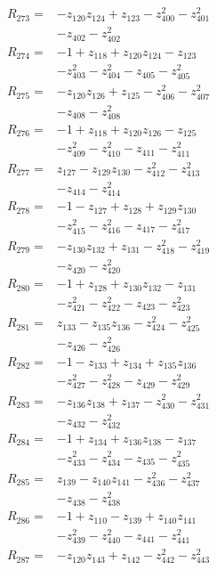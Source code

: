 \begin{align*}
R_{273}={}&-z_{120}z_{124} +z_{123} -z_{400}^{2} -z_{401}^{2}\\
&-z_{402} -z_{402}^{2}\\[2pt]
R_{274}={}&-1 +z_{118} +z_{120}z_{124} -z_{123}\\
&-z_{403}^{2} -z_{404}^{2} -z_{405} -z_{405}^{2}\\[2pt]
R_{275}={}&-z_{120}z_{126} +z_{125} -z_{406}^{2} -z_{407}^{2}\\
&-z_{408} -z_{408}^{2}\\[2pt]
R_{276}={}&-1 +z_{118} +z_{120}z_{126} -z_{125}\\
&-z_{409}^{2} -z_{410}^{2} -z_{411} -z_{411}^{2}\\[2pt]
R_{277}={}&z_{127} -z_{129}z_{130} -z_{412}^{2} -z_{413}^{2}\\
&-z_{414} -z_{414}^{2}\\[2pt]
R_{278}={}&-1 -z_{127} +z_{128} +z_{129}z_{130}\\
&-z_{415}^{2} -z_{416}^{2} -z_{417} -z_{417}^{2}\\[2pt]
R_{279}={}&-z_{130}z_{132} +z_{131} -z_{418}^{2} -z_{419}^{2}\\
&-z_{420} -z_{420}^{2}\\[2pt]
R_{280}={}&-1 +z_{128} +z_{130}z_{132} -z_{131}\\
&-z_{421}^{2} -z_{422}^{2} -z_{423} -z_{423}^{2}\\[2pt]
R_{281}={}&z_{133} -z_{135}z_{136} -z_{424}^{2} -z_{425}^{2}\\
&-z_{426} -z_{426}^{2}\\[2pt]
R_{282}={}&-1 -z_{133} +z_{134} +z_{135}z_{136}\\
&-z_{427}^{2} -z_{428}^{2} -z_{429} -z_{429}^{2}\\[2pt]
R_{283}={}&-z_{136}z_{138} +z_{137} -z_{430}^{2} -z_{431}^{2}\\
&-z_{432} -z_{432}^{2}\\[2pt]
R_{284}={}&-1 +z_{134} +z_{136}z_{138} -z_{137}\\
&-z_{433}^{2} -z_{434}^{2} -z_{435} -z_{435}^{2}\\[2pt]
R_{285}={}&z_{139} -z_{140}z_{141} -z_{436}^{2} -z_{437}^{2}\\
&-z_{438} -z_{438}^{2}\\[2pt]
R_{286}={}&-1 +z_{110} -z_{139} +z_{140}z_{141}\\
&-z_{439}^{2} -z_{440}^{2} -z_{441} -z_{441}^{2}\\[2pt]
R_{287}={}&-z_{120}z_{143} +z_{142} -z_{442}^{2} -z_{443}^{2}\\

\end{align*}
